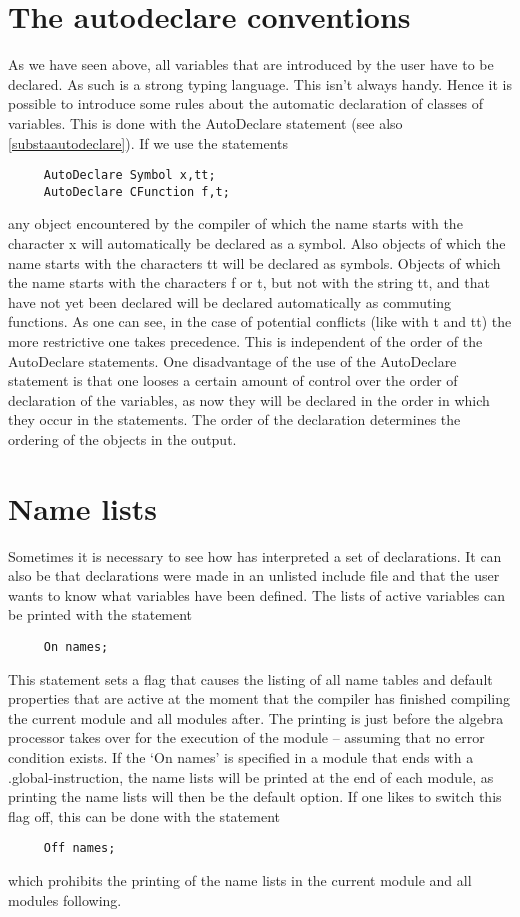 \section{The autodeclare conventions}

As we have seen above, all variables that are introduced by the user have 
to be declared. As such {\FORM} is a strong typing 
language. This isn't always handy. Hence it is possible to introduce some 
rules about the automatic declaration of classes of variables. This is done 
with the AutoDeclare statement (see also 
\ref{substaautodeclare}). If we use the statements
\begin{verbatim}
     AutoDeclare Symbol x,tt;
     AutoDeclare CFunction f,t;
\end{verbatim}
any object encountered by the compiler of which the name starts with the 
character x will automatically be declared as a symbol. Also objects of 
which the name starts with the characters tt will be declared as symbols. 
Objects of which the name starts with the characters f or t, but not with 
the string tt, and that have not yet been declared will be declared 
automatically as commuting functions. As one can see, in the case of 
potential conflicts (like with t and tt) the more 
restrictive one takes precedence. This is independent of the order of the 
AutoDeclare statements. One disadvantage of the use of the AutoDeclare 
statement is that one looses a certain amount of control over the order of 
declaration of the variables, as now they will be declared in the order in 
which they occur in the statements. The order of the declaration determines 
the ordering of the objects in the output.

\section{Name lists}

\label{sect-namelists}
Sometimes it is necessary to see how {\FORM} has interpreted a set
of declarations. It can also be that declarations were made in an unlisted 
include file and that the user wants to know what variables have been 
defined. The lists of active variables 
can be printed with the statement
\begin{verbatim}
     On names;
\end{verbatim}
This statement sets a flag that causes the listing of all name tables and 
default properties that are active at the moment that the compiler has 
finished compiling the current module and all modules after. The printing 
is just before the algebra processor takes over for the execution of the 
module -- assuming that no error condition exists. If the `On names' is 
specified in a module that ends with a .global-instruction, the name lists 
will be printed at the end of each module, as printing the name lists will 
then be the default option. If one likes to switch this flag off, this can 
be done with the statement
\begin{verbatim}
     Off names;
\end{verbatim}
which prohibits the printing of the name lists in the current module and 
all modules following.

